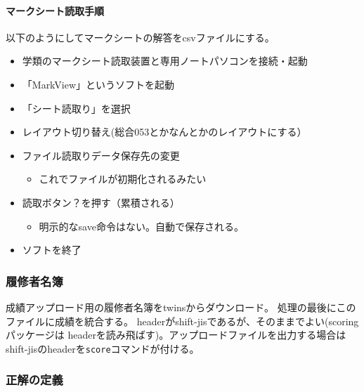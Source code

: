 \paragraph{マークシート読取手順}
\label{マークシート読取手順}

以下のようにしてマークシートの解答をcsvファイルにする。

\begin{itemize}
\item 学類のマークシート読取装置と専用ノートパソコンを接続・起動

\item 「MarkView」というソフトを起動

\item 「シート読取り」を選択

\item レイアウト切り替え(総合053とかなんとかのレイアウトにする）

\item ファイル読取りデータ保存先の変更

\begin{itemize}
\item これでファイルが初期化されるみたい

\end{itemize}

\item 読取ボタン？を押す（累積される）

\begin{itemize}
\item 明示的なsave命令はない。自動で保存される。

\end{itemize}

\item ソフトを終了

\end{itemize}

\subsubsection{履修者名簿}
\label{履修者名簿}

成績アップロード用の履修者名簿をtwinsからダウンロード。
処理の最後にこのファイルに成績を統合する。
headerがshift-jisであるが、そのままでよい(scoringパッケージは
headerを読み飛ばす)。アップロードファイルを出力する場合は
shift-jisのheaderを\texttt{score}コマンドが付ける。

\subsubsection{正解の定義}
\label{正解の定義}

